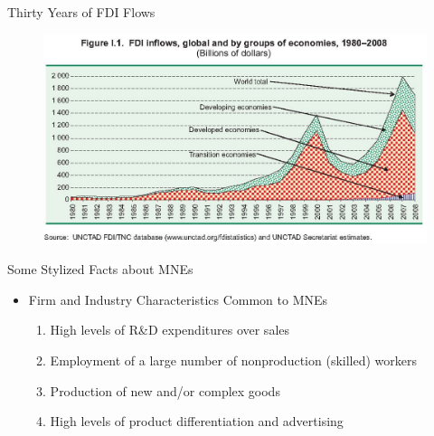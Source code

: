 \documentclass[10pt,hyperref={CJKbookmarks=true},xcolor=dvipsnames,aspectratio=169]{beamer}
\begin{document}
\begin{frame}{Thirty Years of FDI Flows }


\begin{figure}


\begin{centering}
\includegraphics[width=12cm]{fig/fdi/lec7-5}
\par\end{centering}

\end{figure}



\end{frame}

\begin{frame}{Some Stylized Facts about MNEs }

\begin{itemize}
\item Firm and Industry Characteristics Common to MNEs 

\begin{enumerate}
\item High levels of R\&D expenditures over sales 
\item Employment of a large number of nonproduction (skilled) workers 
\item Production of new and/or complex goods 
\item High levels of product differentiation and advertising
\end{enumerate}
\end{itemize}
\end{frame}
\end{document}
